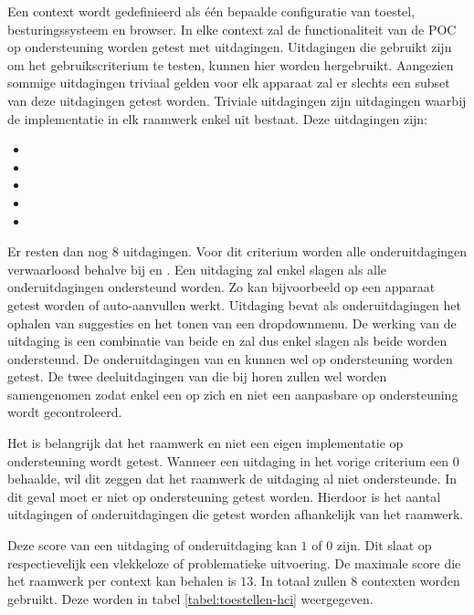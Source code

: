 Een context wordt gedefinieerd als één bepaalde configuratie van toestel, besturingssysteem en browser.
In elke context zal de functionaliteit van de POC op ondersteuning worden getest met uitdagingen.
Uitdagingen die gebruikt zijn om het gebruikscriterium te testen, kunnen hier worden hergebruikt.
Aangezien sommige uitdagingen triviaal gelden voor elk apparaat zal er slechts een subset van deze uitdagingen getest worden.
Triviale uitdagingen zijn uitdagingen waarbij de implementatie in elk raamwerk enkel uit \js bestaat.
Deze uitdagingen zijn:
\begin{itemize}
 \item {}
 \item {}
 \item {}
 \item {}
 \item {}
\end{itemize}
Er resten dan nog $8$ uitdagingen.
Voor dit criterium worden alle onderuitdagingen verwaarloosd behalve bij  en .
Een uitdaging zal enkel slagen als alle onderuitdagingen ondersteund worden.
Zo kan bijvoorbeeld op een apparaat getest worden of auto-aanvullen werkt.
Uitdaging  bevat als onderuitdagingen het ophalen van suggesties en het tonen van een dropdownmenu.
De werking van de uitdaging is een combinatie van beide en zal dus enkel slagen als beide worden ondersteund.
De onderuitdagingen van  en  kunnen wel op ondersteuning worden getest.
De twee deeluitdagingen van  die bij  horen zullen wel worden samengenomen zodat enkel een  op zich en niet een aanpasbare  op ondersteuning wordt gecontroleerd.


Het is belangrijk dat het raamwerk en niet een eigen implementatie op ondersteuning wordt getest.
Wanneer een uitdaging in het vorige criterium een $0$ behaalde, wil dit zeggen dat het raamwerk de uitdaging al niet ondersteunde.
In dit geval moet er niet op ondersteuning getest worden.
Hierdoor is het aantal uitdagingen of onderuitdagingen die getest worden afhankelijk van het raamwerk.


Deze score van een uitdaging of onderuitdaging kan $1$ of $0$ zijn.
Dit slaat op respectievelijk een vlekkeloze of problematieke uitvoering.
De maximale score die het raamwerk per context kan behalen is $13$.
In totaal zullen $8$ contexten worden gebruikt.
Deze worden in tabel \ref{tabel:toestellen-hci} weergegeven.

